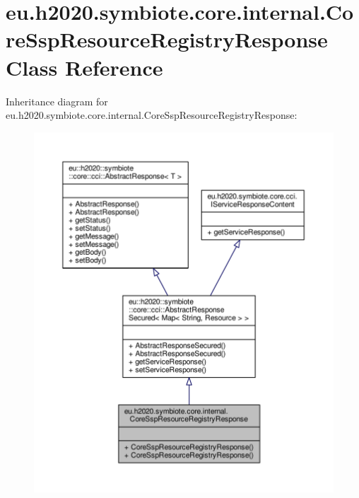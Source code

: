 \hypertarget{classeu_1_1h2020_1_1symbiote_1_1core_1_1internal_1_1CoreSspResourceRegistryResponse}{}\section{eu.\+h2020.\+symbiote.\+core.\+internal.\+Core\+Ssp\+Resource\+Registry\+Response Class Reference}
\label{classeu_1_1h2020_1_1symbiote_1_1core_1_1internal_1_1CoreSspResourceRegistryResponse}


Inheritance diagram for eu.\+h2020.\+symbiote.\+core.\+internal.\+Core\+Ssp\+Resource\+Registry\+Response\+:\nopagebreak
\begin{figure}[H]
\begin{center}
\leavevmode
\includegraphics[width=350pt]{classeu_1_1h2020_1_1symbiote_1_1core_1_1internal_1_1CoreSspResourceRegistryResponse__inherit__graph}
\end{center}
\end{figure}


